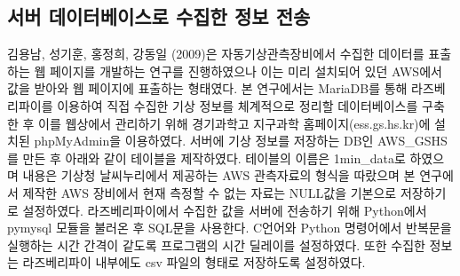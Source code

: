\subsection{서버 데이터베이스로 수집한 정보 전송}
김용남, 성기훈, 홍정희, 강동일 (2009)은 자동기상관측장비에서 수집한 데이터를 표출하는 웹 페이지를 개발하는 연구를 진행하였으나 이는 미리 설치되어 있던 AWS에서 값을 받아와 웹 페이지에 표출하는 형태였다.\cite{Ref2} 본 연구에서는 MariaDB를 통해 라즈베리파이를 이용하여 직접 수집한 기상 정보를 체계적으로 정리할 데이터베이스를 구축한 후 이를 웹상에서 관리하기 위해 경기과학고 지구과학 홈페이지(ess.gs.hs.kr)에 설치된 phpMyAdmin을 이용하였다. 서버에 기상 정보를 저장하는 DB인 AWS\_GSHS를 만든 후 아래와 같이 테이블을 제작하였다. 테이블의 이름은 1min\_data로 하였으며 내용은 기상청 날씨누리에서 제공하는 AWS 관측자료의 형식을 따랐으며 본 연구에서 제작한 AWS 장비에서 현재 측정할 수 없는 자료는 NULL값을 기본으로 저장하기로 설정하였다.
라즈베리파이에서 수집한 값을 서버에 전송하기 위해 Python에서 pymysql 모듈을 불러온 후 SQL문을 사용한다. C언어와 Python 명령어에서 반복문을 실행하는 시간 간격이 같도록 프로그램의 시간 딜레이를 설정하였다. 또한 수집한 정보는 라즈베리파이 내부에도 csv 파일의 형태로 저장하도록 설정하였다.

